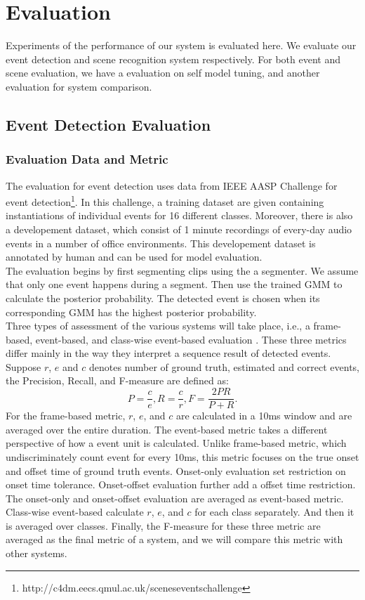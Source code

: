 \chapter{Evaluation}
Experiments of the performance of our system is evaluated here. 
We evaluate our event detection and scene recognition system respectively. 
For both event and scene evaluation, we have a evaluation on self model tuning, and another evaluation for system comparison. 

\section{Event Detection Evaluation}
\subsection{Evaluation Data and Metric}
The evaluation for event detection uses data from IEEE AASP Challenge for event detection\footnote{http://c4dm.eecs.qmul.ac.uk/sceneseventschallenge}.  
In this challenge, a training dataset are given containing instantiations of individual events for 16 different classes. 
Moreover, there is also a developement dataset, which consist of 1 minute recordings of every-day audio events in a number of office environments. 
This developement dataset is annotated by human and can be used for model evaluation. \\ 

The evaluation begins by first segmenting clips using the a segmenter. 
We assume that only one event happens during a segment. 
Then use the trained GMM to calculate the posterior probability. 
The detected event is chosen when its corresponding GMM has the highest posterior probability.\\ 
 
Three types of assessment of the various systems will take place, i.e., a frame-based, event-based, and class-wise event-based evaluation \cite{giannoulis2013database}.  These three metrics differ mainly in the way they interpret a sequence result of detected events.  
Suppose $r$, $e$ and $c$ denotes number of ground truth, estimated and correct events, the Precision, Recall, and F-measure are defined as: 
\begin{equation}
	P = \frac{c}{e}, R = \frac{c}{r}, F = \frac{2PR}{P+R}.  
\end{equation}
For the frame-based metric, $r$, $e$, and $c$ are calculated in a 10ms window and are averaged over the entire duration. 
The event-based metric takes a different perspective of how a event unit is calculated. 
Unlike frame-based metric, which undiscriminately count event for every 10ms, this metric focuses on the true onset and offset time of ground truth events. 
Onset-only evaluation set restriction on onset time tolerance. 
Onset-offset evaluation further add a offset time restriction. 
The onset-only and onset-offset evaluation are averaged as event-based metric. 
Class-wise event-based calculate $r$, $e$, and $c$ for each class separately. And then it is averaged over classes. 
Finally, the F-measure for these three metric are averaged as the final metric of a system, and we will compare this metric with other systems. 

